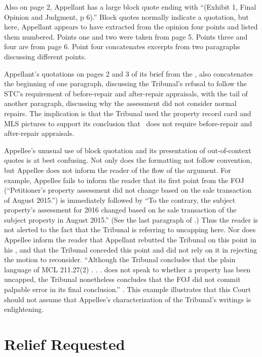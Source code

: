 \documentclass[12pt,\documentclassflag]{michiganCourtOfAppealsBrief}
\begin{document}
Also on page 2, Appellant has a large block quote ending with ``(Exhibit 1, Final Opinion and Judgment, p 6).'' Block quotes normally indicate a quotation, but here, Appellant appears to have extracted from the opinion four points and listed them numbered. Points one and two were taken from page 5. Points three and four are from page 6. Point four concatenates excerpts from two paragraphs discussing different points.

Appellant's quotations on pages 2 and 3 of its brief from the \reconsiderationDenied[2], also concatenates the beginning of one paragraph, discussing the Tribunal's refusal to follow the STC's requirement of before-repair and after-repair appraisals, with the tail of another paragraph, discussing why the assessment did not consider normal repairs. The implication is that the Tribunal used the property record card and MLS pictures to support its conclusion that \mathieuGast\ does not require before-repair and after-repair appraisals.

Appellee's unusual use of block quotation and its presentation of out-of-context quotes is at best confusing. Not only does the formatting not follow convention, but Appellee does not inform the reader of the flow of the argument. For example, Appellee fails to inform the reader that its first point from the FOJ (``Petitioner's property assessment did not change based on the sale transaction of August 2015.'') is immediately followed by ``To the contrary, the subject property's assessment for 2016 changed based on he sale transaction of the subject property in August 2015.'' (See the last paragraph of \foj[5].) Thus the reader is not alerted to the fact that the Tribunal is referring to uncapping here. Nor does Appellee inform the reader that Appellant rebutted the Tribunal on this point in his \motionForReconsideration[4], and that the Tribunal conceded this point and did not rely on it in rejecting the motion to reconsider. ``Although the Tribunal concludes that the plain language of MCL 211.27(2) . . . does not speak to whether a property has been uncapped, the Tribunal nonetheless concludes that the FOJ did not commit palpable error in its final conclusion.'' \reconsiderationDenied[1-2]. This example illustrates that this Court should not assume that Appellee's characterization of the Tribunal's writings is enlightening.

\section{Relief Requested}
\end{document}
